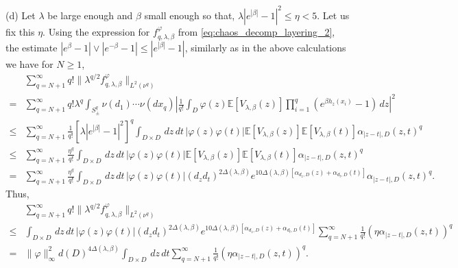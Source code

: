 \documentclass[a4paper, 11pt, reqno]{amsart}
\theoremstyle{definition} \newtheorem{defn}{Definition}[section]
\theoremstyle{remark} \newtheorem{rem}[defn]{Remark}
\theoremstyle{remark} \newtheorem*{rem*}{Remark}
\theoremstyle{plain} \newtheorem{thm}[defn]{Theorem}
\theoremstyle{plain} \newtheorem{lem}[defn]{Lemma}
\theoremstyle{plain} \newtheorem{prop}[defn]{Proposition}
\theoremstyle{plain} \newtheorem{cor}[defn]{Corollary}
\theoremstyle{remark} \newtheorem{exm}[defn]{\textbf{Example}}
\theoremstyle{remark} \newtheorem{exms}[defn]{\textbf{Examples}}
\theoremstyle{remark} \newtheorem*{bl}{}
\numberwithin{equation}{section} %
\newcommand{\x}{\times}
\newcommand{\E}{\mathbb{E}}
\begin{document}
		(d) Let $\lambda$ be large enough and $\beta$ small enough so that, $\lambda |e^{|\beta|}-1|^2 \le \eta < 5$. Let us fix this $\eta$. Using the expression for $f^{\varphi}_{q, \lambda, \beta}$ from \eqref{eq:chaos_decomp_layering_2}, the estimate $|e^{\beta} - 1|\vee |e^{-\beta}-1| \le |e^{|\beta|}-1|$, similarly as in the above calculations we have for $N\ge 1$,
		\begin{align}
			& \sum_{q= N+1}^{\infty} q! \lVert \lambda^{q/2} f^{\varphi}_{q,\lambda, \beta}\rVert_{L^2(\nu^q)} 
			\nonumber \\
			= & \sum_{q= N+1}^{\infty} q! \lambda^q \int_{S_{\pm}^q} \nu(d_1)\cdots\nu(dx_q)  \left|\frac{1}{q!}\int_D \varphi(z) \E [V_{\lambda, \beta} (z)] \prod_{i=1}^q \left(e^{\beta h_z(x_i)} -1 \right) \, dz\right|^2
			\nonumber \\
			\le & \sum_{q= N+1}^{\infty} \frac{1}{q!} \left[ \lambda |e^{|\beta|}-1|^2  \right]^q  \int_{D\x D} \, dz \, dt \,   | \varphi(z) \varphi(t) | \E [V_{\lambda, \beta} (z)] \E [V_{\lambda, \beta} (t)] \alpha_{|z-t|, D} (z,t)^q
			\nonumber \\
			\le & \sum_{q= N+1}^{\infty} \frac{\eta^q}{q!}   \int_{D\x D} \, dz \, dt \, | \varphi(z) \varphi(t) | \E [V_{\lambda, \beta} (z)] \E [V_{\lambda, \beta} (t)] \alpha_{|z-t|, D} (z,t)^q
			\nonumber \\
			= & \sum_{q= N+1}^{\infty} \frac{\eta^q}{q!} \int_{D\x D} \, dz \, dt \, | \varphi(z) \varphi(t) |  (d_z d_t)^{2\Delta(\lambda, \beta)} e^{10\Delta(\lambda, \beta) [\alpha_{d_z, D}(z) + \alpha_{d_t, D}(t)]}  \alpha_{|z-t|, D} (z,t)^q.
		\end{align}
		Thus,
		\begin{align}
			& \sum_{q= N+1}^{\infty} q! \lVert \lambda^{q/2} f^{\varphi}_{q,\lambda, \beta}\rVert_{L^2(\nu^q)} 
			\nonumber \\
			\le &  \int_{D\x D} \, dz \, dt \, | \varphi(z) \varphi(t) | (d_z d_t)^{2\Delta(\lambda, \beta)} e^{10\Delta(\lambda, \beta) [\alpha_{d_z, D}(z) + \alpha_{d_t, D}(t)]}  \sum_{q= N+1}^{\infty} \frac{1}{q!}  (\eta \alpha_{|z-t|, D} (z,t))^q
            \nonumber \\
            = &  \lVert \varphi\rVert_{\infty}^2  d(D)^{4\Delta(\lambda, \beta)} \int_{D\x D} \, dz \, dt \sum_{q= N+1}^{\infty} \frac{1}{q!}  (\eta \alpha_{|z-t|, D} (z,t))^q.  
		\end{align} 
\end{document}
